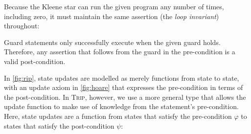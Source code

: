 \documentclass[sigplan]{acmart}%
\begin{document}
Because the Kleene star can run the given program any number of times,
including zero, it must maintain the same assertion (the \emph{loop invariant}) 
throughout:
\begin{code}
\>[2][@{}l@{\AgdaIndent{0}}]%
\>[4]%
\>[10]\AgdaSymbol{:}\AgdaSpace{}%
\AgdaOperator{\AgdaDatatype{[}}\AgdaSpace{}%
\AgdaSpace{}%
\AgdaOperator{\AgdaDatatype{,}}\AgdaSpace{}%
\AgdaSpace{}%
\AgdaOperator{\AgdaDatatype{]}}\AgdaSpace{}%
\AgdaSpace{}%
\AgdaOperator{\AgdaDatatype{[}}\AgdaSpace{}%
\AgdaSpace{}%
\AgdaOperator{\AgdaDatatype{,}}\AgdaSpace{}%
\AgdaSpace{}%
\AgdaOperator{\AgdaDatatype{]}}\<%
\end{code}
Guard statements only successfully execute when the given guard holds. Therefore, 
any assertion that follows from the guard in the pre-condition is 
a valid post-condition.
\begin{code}
\>[2][@{}l@{\AgdaIndent{0}}]%
\>[4]\AgdaSpace{}%
\AgdaSymbol{:}\AgdaSpace{}%
\AgdaSymbol{(}\AgdaSpace{}%
\AgdaSymbol{:}\AgdaSpace{}%
\AgdaSymbol{)}\AgdaSpace{}%
\AgdaSpace{}%
\AgdaOperator{\AgdaDatatype{[}}\AgdaSpace{}%
\AgdaSymbol{(}\AgdaSpace{}%
\AgdaSpace{}%
\AgdaSymbol{)}\AgdaSpace{}%
\AgdaOperator{\AgdaDatatype{,}}\AgdaSpace{}%
\AgdaSpace{}%
\AgdaOperator{\AgdaDatatype{]}}\<%
\end{code}
In \autoref{fig:rip}, state updates are modelled as merely 
functions from state to state, with an update axiom in \autoref{fig:hoare}
that expresses the pre-condition in terms of the post-condition.
In \textsc{Trip}, however, we use a more general type that allows the update function
to make use of knowledge from the statement's pre-condition. Here, state updates are a function 
from states that satisfy the pre-condition $\varphi$ 
to states that satisfy the post-condition $\psi$:
\begin{code}
\>[2][@{}l@{\AgdaIndent{0}}]%
\>[4]%
\>[10]\AgdaSymbol{:}\AgdaSpace{}%
\AgdaSymbol{(}\AgdaSpace{}%
\AgdaSpace{}%
\AgdaSpace{}%
\AgdaSpace{}%
\AgdaSymbol{)}\AgdaSpace{}%
\AgdaSpace{}%
\AgdaOperator{\AgdaDatatype{[}}\AgdaSpace{}%
\AgdaSpace{}%
\AgdaOperator{\AgdaDatatype{,}}\AgdaSpace{}%
%
\>[37]\AgdaOperator{\AgdaDatatype{]}}\<%
\end{code}
\end{document}
